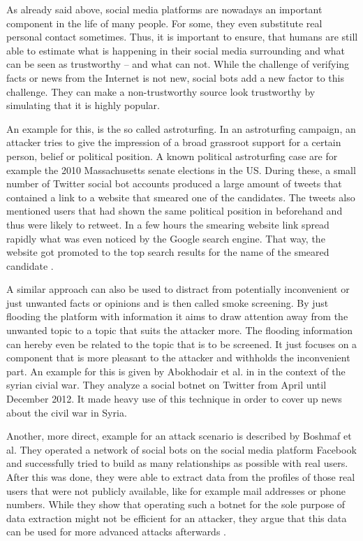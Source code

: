 As already said above, social media platforms are nowadays an important component in the life of many people. For some, they even substitute real personal contact sometimes. Thus, it is important to ensure, that humans are still able to estimate what is happening in their social media surrounding and what can be seen as trustworthy -- and what can not. While the challenge of verifying facts or news from the Internet is not new, social bots add a new factor to this challenge. They can make a non-trustworthy source look trustworthy by simulating that it is highly popular.

An example for this, is the so called astroturfing. In an astroturfing campaign, an attacker tries to give the impression of a broad grassroot support for a certain person, belief or political position. A known political astroturfing case are for example the 2010 Massachusetts senate elections in the US. During these, a small number of Twitter social bot accounts produced a large amount of tweets that contained a link to a website that smeared one of the candidates. The tweets also mentioned users that had shown the same political position in beforehand and thus were likely to retweet. In a few hours the smearing website link spread rapidly what was even noticed by the Google search engine. That way, the website got promoted to the top search results for the name of the smeared candidate \cite{mustafaraj10}. 

A similar approach can also be used to distract from potentially inconvenient or just unwanted facts or opinions and is then called smoke screening. By just flooding the platform with information it aims to draw attention away from the unwanted topic to a topic that suits the attacker more. The flooding information can hereby even be related to the topic that is to be screened. It just focuses on a component that is more pleasant to the attacker and withholds the inconvenient part. An example for this is given by Abokhodair et al. in \cite{abokhodair} in the context of the syrian civial war. They analyze a social botnet on Twitter from April until December 2012. It made heavy use of this technique in order to cover up news about the civil war in Syria.

Another, more direct, example for an attack scenario is described by Boshmaf et al. They operated a network of social bots on the social media platform Facebook and successfully tried to build as many relationships as possible with real users. After this was done, they were able to extract data from the profiles of those real users that were not publicly available, like for example mail addresses or phone numbers. While they show that operating such a botnet for the sole purpose of data extraction might not be efficient for an attacker, they argue that this data can be used for more advanced attacks afterwards \cite{boshmaf13}.

